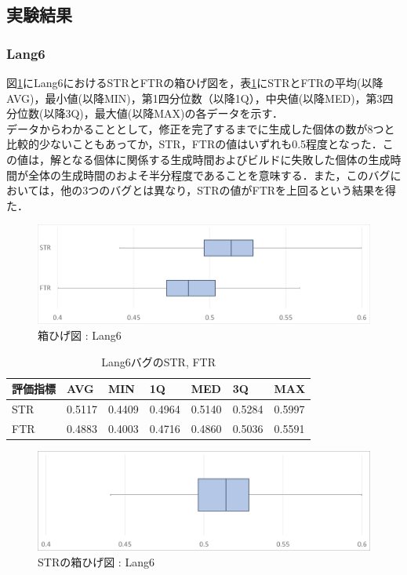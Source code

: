 \documentclass[uplatex,dvipdfmx,a4paper]{jsarticle}
\begin{document}
\subsection{実験結果}
\subsubsection{Lang6}
図\ref{fig:Lang6_boxplot}にLang6におけるSTRとFTRの箱ひげ図を，表\ref{tab:Lang6}にSTRとFTRの平均(以降AVG)，最小値(以降MIN)，第1四分位数（以降1Q），中央値(以降MED)，第3四分位数(以降3Q)，最大値(以降MAX)の各データを示す．\\
データからわかることとして，修正を完了するまでに生成した個体の数が8つと比較的少ないこともあってか，STR，FTRの値はいずれも0.5程度となった．この値は，解となる個体に関係する生成時間およびビルドに失敗した個体の生成時間が全体の生成時間のおよそ半分程度であることを意味する．また，このバグにおいては，他の3つのバグとは異なり，STRの値がFTRを上回るという結果を得た．
\begin{figure}[t]
  \centering
  \includegraphics[width=\linewidth]{fig/Lang6_boxplot.png}
  \caption{箱ひげ図 : Lang6}
  \label{fig:Lang6_boxplot}
\end{figure}
\begin{table}[b]
  \centering
  \caption{Lang6バグのSTR, FTR}
  \label{tab:Lang6}
  \begin{tabular}{l|llllll} \hline\hline
    評価指標 & AVG         & MIN & 1Q & MED & 3Q & MAX   \\\hline
    STR & 0.5117 & 0.4409 & 0.4964 & 0.5140 & 0.5284 & 0.5997  \\
    FTR & 0.4883 & 0.4003 & 0.4716 & 0.4860 & 0.5036 & 0.5591 \\\hline\hline
  \end{tabular}
\end{table}
\begin{figure}[t]
  \centering
  \includegraphics[width=\linewidth]{fig/Lang6_boxplot_STR.png}
  \caption{STRの箱ひげ図 : Lang6}
  \label{fig:Lang6_boxplot_STR}
\end{figure}
\end{document}
